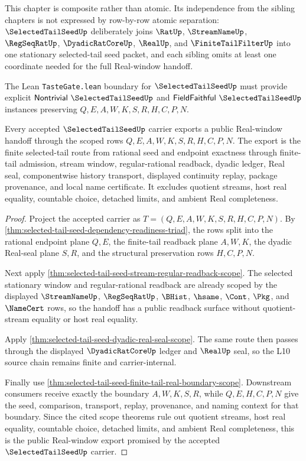 This chapter is composite rather than atomic. Its independence from the sibling chapters is not expressed by row-by-row atomic separation: $\SelectedTailSeedUp$ deliberately joins $\RatUp$, $\StreamNameUp$, $\RegSeqRatUp$, $\DyadicRatCoreUp$, $\RealUp$, and $\FiniteTailFilterUp$ into one stationary selected-tail seed packet, and each sibling omits at least one coordinate needed for the full Real-window handoff.

The Lean \texttt{TasteGate.lean} boundary for $\SelectedTailSeedUp$ must provide explicit $\mathsf{Nontrivial}\ \SelectedTailSeedUp$ and $\mathsf{FieldFaithful}\ \SelectedTailSeedUp$ instances preserving $Q,E,A,W,K,S,R,H,C,P,N$.


\begin{theorem}
\label{thm:selected-tail-seed-public-real-window-export}
Every accepted $\SelectedTailSeedUp$ carrier exports a public Real-window handoff through the scoped rows $Q,E,A,W,K,S,R,H,C,P,N$. The export is the finite selected-tail route from rational seed and endpoint exactness through finite-tail admission, stream window, regular-rational readback, dyadic ledger, Real seal, componentwise history transport, displayed continuity replay, package provenance, and local name certificate. It excludes quotient streams, host real equality, countable choice, detached limits, and ambient Real completeness.
\end{theorem}
\begin{proof}
Project the accepted carrier as $T=(Q,E,A,W,K,S,R,H,C,P,N)$. By \autoref{thm:selected-tail-seed-dependency-readiness-triad}, the rows split into the rational endpoint plane $Q,E$, the finite-tail readback plane $A,W,K$, the dyadic Real-seal plane $S,R$, and the structural preservation rows $H,C,P,N$.

Next apply \autoref{thm:selected-tail-seed-stream-regular-readback-scope}. The selected stationary window and regular-rational readback are already scoped by the displayed $\StreamNameUp$, $\RegSeqRatUp$, $\BHist$, $\hsame$, $\Cont$, $\Pkg$, and $\NameCert$ rows, so the handoff has a public readback surface without quotient-stream equality or host real equality.

Apply \autoref{thm:selected-tail-seed-dyadic-real-seal-scope}. The same route then passes through the displayed $\DyadicRatCoreUp$ ledger and $\RealUp$ seal, so the L10 source chain remains finite and carrier-internal.

Finally use \autoref{thm:selected-tail-seed-finite-tail-real-boundary-scope}. Downstream consumers receive exactly the boundary $A,W,K,S,R$, while $Q,E,H,C,P,N$ give the seed, comparison, transport, replay, provenance, and naming context for that boundary. Since the cited scope theorems rule out quotient streams, host real equality, countable choice, detached limits, and ambient Real completeness, this is the public Real-window export promised by the accepted $\SelectedTailSeedUp$ carrier.
\end{proof}

